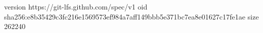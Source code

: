 version https://git-lfs.github.com/spec/v1
oid sha256:e8b35429c3fc216e1569573ef984a7aff149bbb5e371bc7ea8e01627c17fe1ae
size 262240
